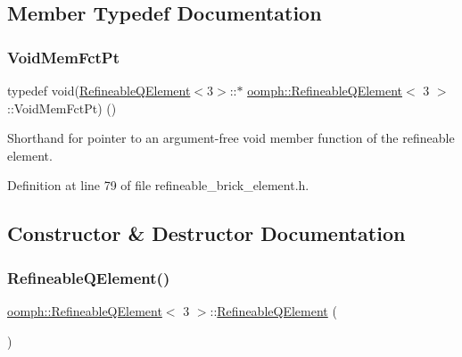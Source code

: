 \subsection{Member Typedef Documentation}
\mbox{\label{classoomph_1_1RefineableQElement_3_013_01_4_ad23b3146537ecd540f79f485cc1d9e3f}} 
\subsubsection{\texorpdfstring{Void\+Mem\+Fct\+Pt}{VoidMemFctPt}}
{\footnotesize\ttfamily typedef void(\hyperlink{classoomph_1_1RefineableQElement}{Refineable\+Q\+Element}$<$3$>$\+::$\ast$ \hyperlink{classoomph_1_1RefineableQElement}{oomph\+::\+Refineable\+Q\+Element}$<$ 3 $>$\+::Void\+Mem\+Fct\+Pt) ()}



Shorthand for pointer to an argument-\/free void member function of the refineable element. 



Definition at line 79 of file refineable\+\_\+brick\+\_\+element.\+h.



\subsection{Constructor \& Destructor Documentation}
\mbox{\label{classoomph_1_1RefineableQElement_3_013_01_4_afebcbfcb8c222f8912043b0c9513a945}} 
\subsubsection{\texorpdfstring{Refineable\+Q\+Element()}{RefineableQElement()}\hspace{0.1cm}{\footnotesize\ttfamily [1/2]}}
{\footnotesize\ttfamily \hyperlink{classoomph_1_1RefineableQElement}{oomph\+::\+Refineable\+Q\+Element}$<$ 3 $>$\+::\hyperlink{classoomph_1_1RefineableQElement}{Refineable\+Q\+Element} (\begin{DoxyParamCaption}{ }\end{DoxyParamCaption})\hspace{0.3cm}{\ttfamily [inline]}}



